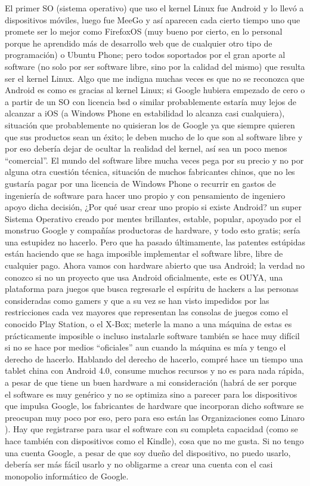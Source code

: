 \begin{multicols}{2}
El primer SO (sistema operativo) que uso el kernel Linux fue Android y lo llevó a dispositivos móviles, luego fue MeeGo y así aparecen cada cierto tiempo uno que promete ser lo mejor como FirefoxOS (muy bueno por cierto, en lo personal porque he aprendido más de desarrollo web que de cualquier otro tipo de programación) o Ubuntu Phone; pero todos soportados por el gran aporte al software (no solo por ser software libre, sino por la calidad del mismo) que resulta ser el kernel Linux.
Algo que me indigna muchas veces es que no se reconozca que Android es como es gracias al kernel Linux; si Google hubiera empezado de cero o a partir de un SO con licencia bsd o similar probablemente estaría muy lejos de alcanzar a iOS (a Windows Phone en estabilidad lo alcanza casi cualquiera), situación que probablemente no quisieran los de Google ya que siempre quieren que sus productos sean un éxito; le deben mucho de lo que son al software libre y por eso debería dejar de ocultar la realidad del kernel, así sea un poco menos “comercial”.
El mundo del software libre mucha veces pega por su precio y no por alguna otra cuestión técnica, situación de muchos fabricantes chinos, que no les gustaría pagar por una licencia de Windows Phone o recurrir en gastos de ingeniería de software para hacer uno propio y con pensamiento de ingeniero apoyo dicha decisión, ¿Por qué usar crear uno propio si existe Android? un super Sistema Operativo creado por mentes brillantes, estable, popular, apoyado por el monstruo Google y compañías productoras de hardware, y todo esto gratis; sería una estupidez no hacerlo. Pero que ha pasado últimamente, las patentes estúpidas están haciendo que se haga imposible implementar el software libre, libre de cualquier pago.
Ahora vamos con hardware abierto que usa Android; la verdad no conozco si no un proyecto que usa Android oficialmente, este es OUYA, una plataforma para juegos que busca regresarle el espíritu de hackers a las personas consideradas como gamers y que a su vez se han visto impedidos por las restricciones cada vez mayores que representan las consolas de juegos como el conocido Play Station, o el X-Box; meterle la mano a una máquina de estas es prácticamente imposible o incluso instalarle software también se hace muy difícil si no se hace por medios “oficiales” aun cuando la máquina es mía y tengo el derecho de hacerlo.
Hablando del derecho de hacerlo, compré hace un tiempo una tablet china con Android 4.0, consume muchos recursos y no es para nada rápida, a pesar de que tiene un buen hardware a mi consideración (habrá de ser porque el software es muy genérico y no se optimiza sino a parecer para los dispositivos que impulsa Google, los fabricantes de hardware que incorporan dicho software se preocupan muy poco por eso, pero para eso están las Organizaciones como Linaro ). Hay que registrarse para usar el software con su completa capacidad (como se hace también con dispositivos como el Kindle), cosa que no me gusta. Si no tengo una cuenta Google, a pesar de que soy dueño del dispositivo, no puedo usarlo, debería ser más fácil usarlo y no obligarme a crear una cuenta con el casi monopolio informático de Google.

\end{multicols}
